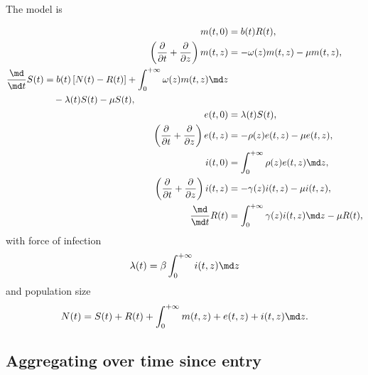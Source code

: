 \documentclass{jpmarticle}
\let\subequationsorig\subequations%
\let\endsubequationsorig\endsubequations%
\renewenvironment{subequations}{
  \subequationsorig
  \renewcommand{\theequation}{\theparentequation.\arabic{equation}}
}{
  \endsubequationsorig
}
\begin{document}
The model is
\begin{subequations}
  \label{model_time_since_entry_structured}
  \begin{align}
    m(t, 0) &=
    b(t) R(t),
    \\
    \left(\frac{\partial}{\partial t}
      + \frac{\partial}{\partial z}\right)
    m(t, z) &=
    - \omega(z) m(t, z) - \mu m(t, z),
    \\
    \begin{split}
      \frac{\md}{\md t} S(t) &=
      b(t) \left[N(t) - R(t)\right]
      + \int_0^{+\infty} \omega(z) m(t, z) \md z
      \\ & \quad {}
      - \lambda(t) S(t) - \mu S(t),
    \end{split}
    \\
    e(t, 0) &=
    \lambda(t) S(t),
    \\
    \left(\frac{\partial}{\partial t}
      + \frac{\partial}{\partial z}\right)
    e(t, z) &=
    - \rho(z) e(t, z) - \mu e(t, z),
    \\
    i(t, 0) &=
    \int_0^{+\infty} \rho(z) e(t, z) \md z,
    \\
    \left(\frac{\partial}{\partial t}
      + \frac{\partial}{\partial z}\right)
    i(t, z) &=
    - \gamma(z) i(t, z) - \mu i(t, z),
    \\
    \frac{\md}{\md t} R(t) &=
    \int_0^{+\infty} \gamma(z) i(t, z) \md z
    - \mu R(t),
  \end{align}
  with force of infection
  \begin{equation}
    \lambda(t) = \beta \int_0^{+\infty} i(t, z) \md z
  \end{equation}
  and population size
  \begin{equation}
    N(t) =
    S(t) + R(t)
    + \int_0^{+\infty} m(t, z) + e(t, z) + i(t, z) \md z.
  \end{equation}
\end{subequations}


\subsection{Aggregating over time since entry}
\end{document}
